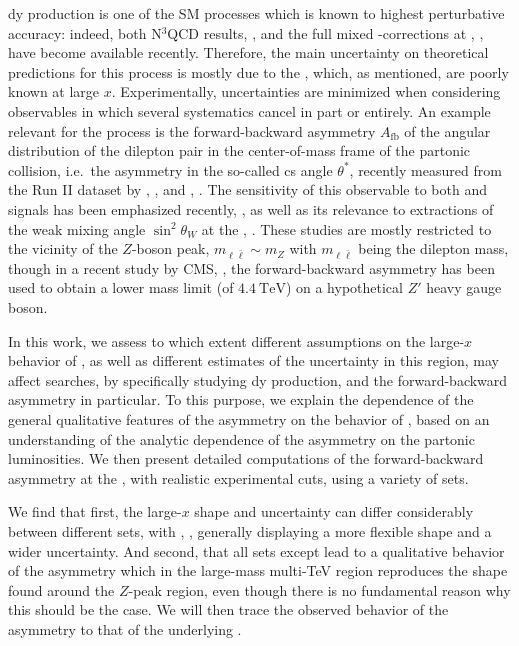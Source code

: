 \acrlong{dy} production is one of the SM processes which is known to highest
perturbative accuracy: indeed, both N$^3$\lo QCD results, \cite{Duhr:2021vwj}, and
the full mixed \qcd-\ew corrections at \nnlo,
\cite{Buccioni:2020cfi,Buccioni:2022kgy,Bonciani:2020tvf,Bonciani:2021zzf,Armadillo:2022bgm},
have become available recently.
%
Therefore, the main uncertainty on theoretical predictions for this process is
mostly due to the \pdfs, which, as mentioned, are poorly known at large $x$.
%
Experimentally, uncertainties are minimized when considering observables in
which several systematics cancel in part or entirely.
%
An example relevant for the \dy process is the forward-backward asymmetry
$A_{\text{fb}}$ of the angular distribution of the dilepton pair in the
center-of-mass frame of the partonic collision, i.e.\ the asymmetry in the
so-called \acrlong{cs} angle $\theta^*$, recently measured from the Run II
dataset by \atlas, \cite{ATLAS:2017rue}, and \cms, \cite{CMS:2022uul}.
%
The sensitivity of this observable to both \pdfs and \bsm signals has
been emphasized recently,
\cite{Fiaschi:2021sin,Fiaschi:2021okg,Accomando:2019vqt,Accomando:2018nig}, as
well as its relevance to extractions of the weak mixing angle $\sin^2\theta_W$
at the \lhc, \cite{CMS:2018ktx}.
These studies  are mostly restricted to the vicinity of the $Z$-boson peak,
$m_{\ell\bar{\ell}} \sim m_Z$ with $m_{\ell\bar{\ell}}$ being the dilepton
mass, though in a recent study by CMS, \cite{CMS:2022uul}, the forward-backward
asymmetry has been used to obtain a lower mass limit (of
$\SI{4.4}{\tera\electronvolt}$) on a hypothetical $Z'$ heavy gauge boson.

In this work, we assess to which extent different assumptions on the large-$x$
behavior of \pdfs, as well as different estimates of the \pdf uncertainty in
this region, may affect \bsm searches, by specifically studying \nc
\acrlong{dy} production, and the forward-backward asymmetry in particular.
To this purpose, we explain the dependence of the general qualitative features
of the asymmetry on the behavior of \pdfs, based on an understanding  of the
analytic dependence of the asymmetry on the partonic luminosities.
%
We then present detailed computations of the forward-backward asymmetry at the
\lhc, with realistic experimental cuts, using a variety of \pdf sets.

We find that first, the large-$x$ \pdf shape and uncertainty can differ
considerably between different \pdf sets, with ,
\cite{Ball:2021leu}, generally displaying a more flexible shape and a wider
uncertainty.
%
And second, that all \pdf sets except  lead to a qualitative
behavior of the asymmetry which in the large-mass multi-TeV region reproduces
the shape found around the $Z$-peak region, even though there is no fundamental
reason why this should be the case.
%
We will then trace the observed behavior of the asymmetry to that of the
underlying \pdfs.
